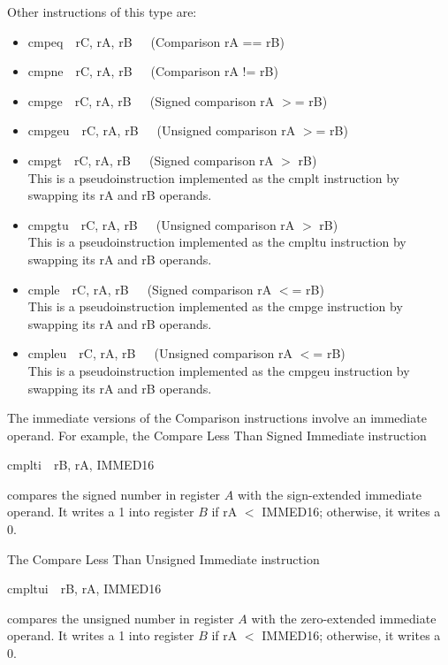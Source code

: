 \documentclass[11pt, twoside, pdftex]{article}
\begin{document}
\noindent
Other instructions of this type are:
\begin{itemize}
\item {\sf cmpeq~~rC, rA, rB}~~~(Comparison rA == rB)
\item {\sf cmpne~~rC, rA, rB}~~~(Comparison rA != rB)
\item {\sf cmpge~~rC, rA, rB}~~~(Signed comparison rA $>$= rB)
\item {\sf cmpgeu~~rC, rA, rB}~~~(Unsigned comparison rA $>$= rB)
\item {\sf cmpgt~~rC, rA, rB}~~~(Signed comparison rA $>$ rB) \\
This is a pseudoinstruction implemented as the {\sf cmplt} instruction by swapping
its rA and rB operands.
\item {\sf cmpgtu~~rC, rA, rB}~~~(Unsigned comparison rA $>$ rB) \\
This is a pseudoinstruction implemented as the {\sf cmpltu} instruction by swapping
its rA and rB operands.
\item {\sf cmple~~rC, rA, rB}~~~(Signed comparison rA $<$= rB) \\
This is a pseudoinstruction implemented as the {\sf cmpge} instruction by swapping
its rA and rB operands.
\item {\sf cmpleu~~rC, rA, rB}~~~(Unsigned comparison rA $<$= rB) \\
This is a pseudoinstruction implemented as the {\sf cmpgeu} instruction by swapping
its rA and rB operands.
\end{itemize}

The immediate versions of the Comparison instructions involve an immediate operand.
For example, the Compare Less Than Signed Immediate instruction
\begin{center}
{\sf cmplti~~rB, rA, IMMED16}
\end{center}
\noindent
compares the signed number in register $A$ with the sign-extended immediate operand. 
It writes a 1 into register $B$ if {\sf rA $<$ IMMED16}; 
otherwise, it writes a 0.
 

\noindent
The Compare Less Than Unsigned Immediate instruction
\begin{center}
{\sf cmpltui~~rB, rA, IMMED16}
\end{center}
\noindent
compares the unsigned number in register $A$ with the zero-extended immediate operand. 
It writes a 1 into register $B$ if {\sf rA $<$ IMMED16}; 
otherwise, it writes a 0.
 
\end{document}
